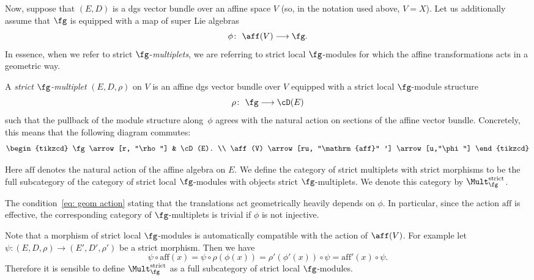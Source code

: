 Now, suppose that $(E,D)$ is a dgs vector bundle over an affine space $V$ (so, in the notation used above, $V=X$). Let us additionally assume that $\fg$ is equipped with a map of super Lie algebras
\begin{equation*}
\phi \colon \ \aff(V) \longrightarrow \fg .
\end{equation*}
In essence, when we refer to strict $\fg$-\emph{multiplets}, we are referring to strict local $\fg$-modules for which the affine transformations acts in a geometric way.
\begin{dfn}
	A \emph{strict $\fg$-multiplet} $(E,D,\rho)$ on $V$ is an affine dgs vector bundle over $V$ equipped with a strict local $\fg$-module structure
	\begin{equation*}
	\rho \colon \ \fg \longrightarrow \cD(E)
	\end{equation*}
	such that the pullback of the module structure along~$\phi$ agrees with the natural action on sections of the affine vector bundle. Concretely, this means that the following diagram commutes:
	\begin{equation} \label{eq: geom action}
	\begin{tikzcd}
	\fg \arrow[r, "\rho"] & \cD(E). \\
	\aff(V) \arrow[ru, "\mathrm{aff}" '] \arrow[u,"\phi"]
	\end{tikzcd}
	\end{equation}
\end{dfn}
Here $\mathrm{aff}$ denotes the natural action of the affine algebra on $E$.
We define the category of strict multiplets with strict morphisms to be the full subcategory of the category of strict local $\fg$-modules with objects strict $\fg$-multiplets. We denote this category by $\Mult_{\fg}^{\mathrm{strict}}$.
%
\begin{rmk}
	The condition~\eqref{eq: geom action} stating that the translations act geometrically heavily depends on $\phi$. In particular, since the action $\mathrm{aff}$ is effective, the corresponding category of $\fg$-multiplets is trivial if $\phi$ is not injective.
\end{rmk}
\begin{rmk}
	Note that a morphism of strict local $\fg$-modules is automatically compatible with the action of $\aff(V)$. For example let $\psi \colon (E,D,\rho) \longrightarrow (E',D',\rho')$ be a strict morphism. Then we have
	\begin{equation*}
	\psi \circ \mathrm{aff}(x) = \psi \circ \rho(\phi(x)) = \rho'(\phi'(x)) \circ \psi = \mathrm{aff}'(x) \circ \psi .
	\end{equation*}
	Therefore it is sensible to define $\Mult_\fg^{\text{strict}}$ as a full subcategory of strict local $\fg$-modules.
\end{rmk}
%
